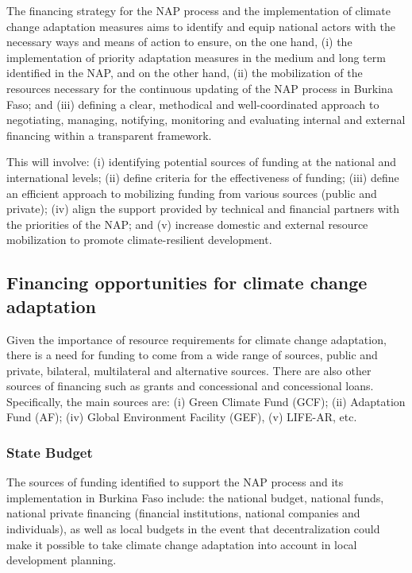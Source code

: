 \documentclass[
]{book}
\begin{document}
The financing strategy for the NAP process and the implementation of climate change adaptation measures aims to identify and equip national actors with the necessary ways and means of action to ensure, on the one hand, (i) the implementation of priority adaptation measures in the medium and long term identified in the NAP, and on the other hand, (ii) the mobilization of the resources necessary for the continuous updating of the NAP process in Burkina Faso; and (iii) defining a clear, methodical and well-coordinated approach to negotiating, managing, notifying, monitoring and evaluating internal and external financing within a transparent framework.

This will involve: (i) identifying potential sources of funding at the national and international levels; (ii) define criteria for the effectiveness of funding; (iii) define an efficient approach to mobilizing funding from various sources (public and private); (iv) align the support provided by technical and financial partners with the priorities of the NAP; and (v) increase domestic and external resource mobilization to promote climate-resilient development.

\subsection{Financing opportunities for climate change adaptation}\label{financing-opportunities-for-climate-change-adaptation}

Given the importance of resource requirements for climate change adaptation, there is a need for funding to come from a wide range of sources, public and private, bilateral, multilateral and alternative sources. There are also other sources of financing such as grants and concessional and concessional loans. Specifically, the main sources are: (i) Green Climate Fund (GCF); (ii) Adaptation Fund (AF); (iv) Global Environment Facility (GEF), (v) LIFE-AR, etc.

\subsubsection{State Budget}\label{state-budget}

The sources of funding identified to support the NAP process and its implementation in Burkina Faso include: the national budget, national funds, national private financing (financial institutions, national companies and individuals), as well as local budgets in the event that decentralization could make it possible to take climate change adaptation into account in local development planning.
\end{document}
